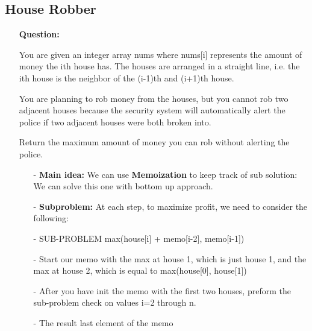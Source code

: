 \documentclass[12pt]{article}
\begin{document}
\subsection{House Robber}
\begin{enumerate}
  \item[] \textbf{Question:}

You are given an integer array nums where nums[i] represents the amount of money the ith house has. The houses are arranged in a straight line, i.e. the ith house is the neighbor of the (i-1)th and (i+1)th house.

You are planning to rob money from the houses, but you cannot rob two adjacent houses because the security system will automatically alert the police if two adjacent houses were both broken into.

Return the maximum amount of money you can rob without alerting the police.

    \begin{enumerate}
      \item[-] \textbf{Main idea:} We can use \textbf{Memoization} to keep track of sub solution: We can solve this one with bottom up approach.
      \item[-] \textbf{Subproblem:} At each step, to maximize profit, we need to consider the following:
      \item[-] SUB-PROBLEM max(house[i] + memo[i-2], memo[i-1])
      \item[-] Start our memo with the max at house 1, which is just house 1, and the max at house 2, which is equal to max(house[0], house[1])
      \item[-] After you have init the memo with the first two houses, preform the sub-problem check on values i=2 through n.
      \item[-] The result last element of the memo
    \end{enumerate}
\end{enumerate}
\end{document}

